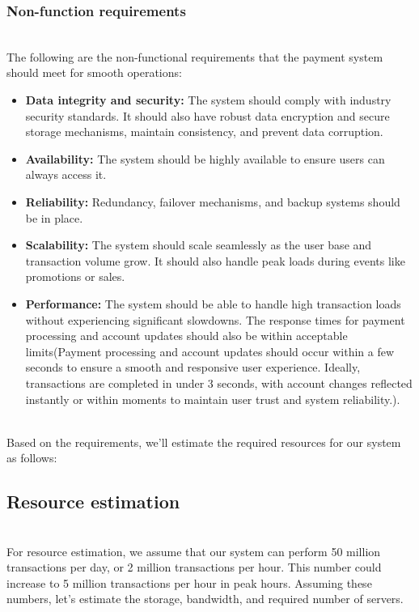 \subsubsection{Non-function requirements}\label{5LDiKiJczmlXpnrSIL_8H}
\\
The following are the non-functional requirements that the payment system should meet for smooth operations:

\begin{itemize}
\item
\protect{}\label{mvXDeOk-So9A7oMDj9eAd}
\textbf{Data integrity and security:} The system should comply with industry security standards. It should also have robust data encryption and secure storage mechanisms, maintain consistency, and prevent data corruption.
\item
\protect{}\label{6fqK_ilNjAkQm9ZHvHewD}
\textbf{Availability:} The system should be highly available to ensure users can always access it.
\item
\protect{}\label{o5kV5u6cHfpuoCh2-cgYK}
\textbf{Reliability:} Redundancy, failover mechanisms, and backup systems should be in place.
\item
\protect{}\label{dLDrtspGxL9UaVSYwmziA}
\textbf{Scalability:} The system should scale seamlessly as the user base and transaction volume grow. It should also handle peak loads during events like promotions or sales.
\item
\protect{}\label{p1b3kcMs5u6yrBe69Y0L-}
\textbf{Performance:} The system should be able to handle high transaction loads without experiencing significant slowdowns. The response times for payment processing and account updates should also be within acceptable limits(Payment processing and account updates should occur within a few seconds to ensure a smooth and responsive user experience. Ideally, transactions are completed in under 3 seconds, with account changes reflected instantly or within moments to maintain user trust and system reliability.).
\end{itemize}
\\
Based on the requirements, we'll estimate the required resources for our system as follows:

\subsection{Resource estimation}\label{x-oG0xpEFY_nG9yTexRDf}
\\
For resource estimation, we assume that our system can perform 50 million transactions per day, or 2 million transactions per hour. This number could increase to 5 million transactions per hour in peak hours. Assuming these numbers, let's estimate the storage, bandwidth, and required number of servers.

